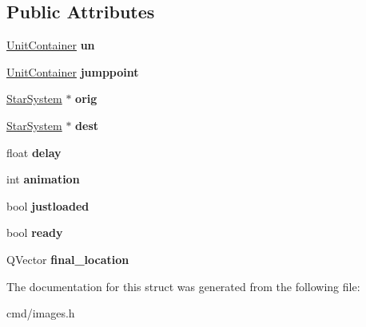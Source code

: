 \subsection*{Public Attributes}
\begin{DoxyCompactItemize}
\item 
\hyperlink{classUnitContainer}{Unit\+Container} {\bfseries un}\hypertarget{structunorigdest_a3f7f590985bad02024f1f8d161c85b29}{}\label{structunorigdest_a3f7f590985bad02024f1f8d161c85b29}

\item 
\hyperlink{classUnitContainer}{Unit\+Container} {\bfseries jumppoint}\hypertarget{structunorigdest_ad7dea1bdf515c7268375926f9264023f}{}\label{structunorigdest_ad7dea1bdf515c7268375926f9264023f}

\item 
\hyperlink{classStarSystem}{Star\+System} $\ast$ {\bfseries orig}\hypertarget{structunorigdest_a5bd59e391468c4dd75bbb4a14511eb01}{}\label{structunorigdest_a5bd59e391468c4dd75bbb4a14511eb01}

\item 
\hyperlink{classStarSystem}{Star\+System} $\ast$ {\bfseries dest}\hypertarget{structunorigdest_a07136aef3d0bf0886780113654a581f8}{}\label{structunorigdest_a07136aef3d0bf0886780113654a581f8}

\item 
float {\bfseries delay}\hypertarget{structunorigdest_ac64bb6865a6d4c0582f14b0dc6edbb37}{}\label{structunorigdest_ac64bb6865a6d4c0582f14b0dc6edbb37}

\item 
int {\bfseries animation}\hypertarget{structunorigdest_aacd89116ceeac9f6023ca778edda8cec}{}\label{structunorigdest_aacd89116ceeac9f6023ca778edda8cec}

\item 
bool {\bfseries justloaded}\hypertarget{structunorigdest_a78faad085163fff63f362749fb24df79}{}\label{structunorigdest_a78faad085163fff63f362749fb24df79}

\item 
bool {\bfseries ready}\hypertarget{structunorigdest_ab4a7607493d0f40cb9457d11ff4d25ac}{}\label{structunorigdest_ab4a7607493d0f40cb9457d11ff4d25ac}

\item 
Q\+Vector {\bfseries final\+\_\+location}\hypertarget{structunorigdest_a0e5ffc3c223f87c902a37d82fa4159ac}{}\label{structunorigdest_a0e5ffc3c223f87c902a37d82fa4159ac}

\end{DoxyCompactItemize}


The documentation for this struct was generated from the following file\+:\begin{DoxyCompactItemize}
\item 
cmd/images.\+h\end{DoxyCompactItemize}
